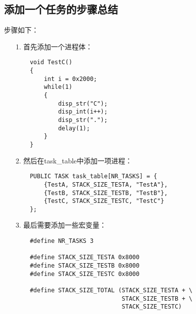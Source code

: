 \documentclass[a4paper,left=2.5cm,right=2.5cm,11pt]{report}
\begin{document}
\subsection{添加一个任务的步骤总结}
	步骤如下：
	\begin{itemize}
		\item[1.] 首先添加一个进程体：
		\begin{lstlisting}
	void TestC()
	{
		int i = 0x2000;
		while(1)
		{
			disp_str("C");
			disp_int(i++);
			disp_str(".");
			delay(1);
		}
	}
		\end{lstlisting}

		\item[2.] 然后在task\_table中添加一项进程：
		\begin{lstlisting}
	PUBLIC TASK task_table[NR_TASKS] = {
		{TestA, STACK_SIZE_TESTA, "TestA"},
		{TestB, STACK_SIZE_TESTB, "TestB"},
		{TestC, STACK_SIZE_TESTC, "TestC"}
	};	
		\end{lstlisting}

		\item[3.] 最后需要添加一些宏变量：
		\begin{lstlisting}
	#define NR_TASKS 3

	#define STACK_SIZE_TESTA 0x8000
	#define STACK_SIZE_TESTB 0x8000
	#define STACK_SIZE_TESTC 0x8000

	#define STACK_SIZE_TOTAL (STACK_SIZE_TESTA + \
							  STACK_SIZE_TESTB + \
							  STACK_SIZE_TESTC)
		\end{lstlisting}
	\end{itemize}
\end{document}
